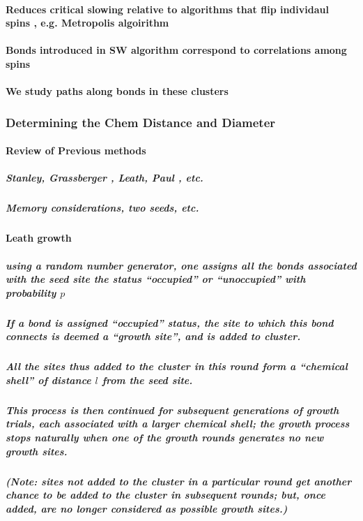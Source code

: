 \documentclass[pre,preprint]{revtex4-1}
\begin{document}
\paragraph{Reduces critical slowing relative to algorithms that flip individaul spins \cite{NeBa99}, e.g. Metropolis algoirithm \cite{Met}}
\label{sec-1.2.1.4}
\paragraph{Bonds introduced in SW algorithm correspond to correlations among spins}
\label{sec-1.2.1.5}
\paragraph{We study paths along bonds in these clusters}
\label{sec-1.2.1.6}
\subsubsection{Determining the Chem Distance and Diameter}
\label{sec-1.2.2}
\paragraph{Review of Previous methods}
\label{sec-1.2.2.1}
\subparagraph{Stanley, Grassberger \cite{Gr99}, Leath, Paul \cite{Paul2001}, etc.}
\label{sec-1.2.2.1.1}
\subparagraph{Memory considerations, two seeds, etc.}
\label{sec-1.2.2.1.2}
\paragraph{Leath growth \cite{Leath}}
\label{sec-1.2.2.2}
\subparagraph{using a random number generator, one assigns all the bonds associated with the seed site the status ``occupied'' or ``unoccupied'' with probability $p$}
\label{sec-1.2.2.2.1}
\subparagraph{If a bond is assigned ``occupied'' status, the site to which this bond connects is deemed a ``growth site'', and is added to cluster.}
\label{sec-1.2.2.2.2}
\subparagraph{All the sites thus added to the cluster in this round form a ``chemical shell'' of distance $l$ from the seed site.}
\label{sec-1.2.2.2.3}
\subparagraph{This process is then continued for subsequent generations of growth trials, each associated with a larger chemical shell; the growth process stops naturally when one of the growth rounds generates no new growth sites.}
\label{sec-1.2.2.2.4}
\subparagraph{(Note: sites not added to the cluster in a particular round get another chance to be added to the cluster in subsequent rounds; but, once added, are no longer considered as possible growth sites.)}
\label{sec-1.2.2.2.5}
\end{document}

